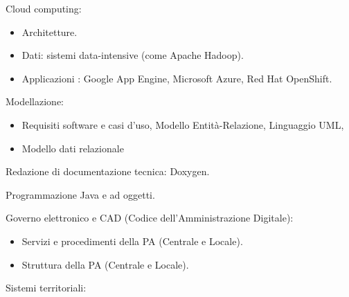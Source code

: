 \documentclass[totpages,helvetica,openbib,italian]{europecv}
\begin{document}
\begin{europecv}
{\begin{minipage}[t]{1\linewidth}
Cloud computing:
\begin{itemize}
   \vspace{-3mm}\item[]Architetture.
   \vspace{-3mm}\item[]Dati: sistemi data-intensive (come Apache Hadoop).
   \vspace{-3mm}\item[]Applicazioni : Google App Engine, Microsoft Azure, Red Hat OpenShift.
   \end{itemize}

Modellazione:
\begin{itemize}

 \vspace{-3mm}\item[]   Requisiti software e casi d’uso, Modello Entità-Relazione, Linguaggio UML,
\vspace{-3mm}\item[]    Modello dati relazionale
    \end{itemize}
Redazione di documentazione tecnica: Doxygen.\\
\vspace{1mm}

Programmazione Java e ad oggetti.\\
\vspace{1mm}

Governo elettronico e CAD (Codice dell’Amministrazione Digitale):
\begin{itemize}

\vspace{-3mm}\item[] Servizi e procedimenti della PA (Centrale e Locale).
\vspace{-3mm}\item[]    Struttura della PA (Centrale e Locale).
\end{itemize}
  Sistemi territoriali:
  \begin{itemize}


\end{itemize}
\end{minipage}}
\end{europecv}
\end{document}
